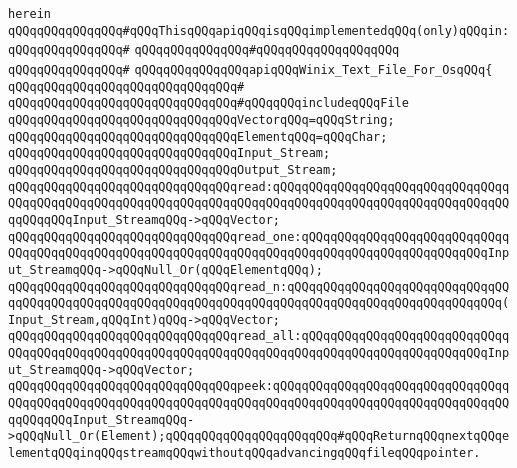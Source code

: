 \verb|herein|\newline
\newline
\verb|qQQqqQQqqQQqqQQq#qQQqThisqQQqapiqQQqisqQQqimplementedqQQq(only)qQQqin:|\newline
\verb|qQQqqQQqqQQqqQQq#|\newline
\verb|qQQqqQQqqQQqqQQq#qQQqqQQqqQQqqQQqqQQq|\newline
\verb|qQQqqQQqqQQqqQQq#|\newline
\verb|qQQqqQQqqQQqqQQqapiqQQqWinix_Text_File_For_OsqQQq{|\newline
\verb|qQQqqQQqqQQqqQQqqQQqqQQqqQQqqQQq#|\newline
\verb|qQQqqQQqqQQqqQQqqQQqqQQqqQQqqQQq#qQQqqQQqincludeqQQqFile|\newline
\verb|qQQqqQQqqQQqqQQqqQQqqQQqqQQqqQQqVectorqQQq=qQQqString;|\newline
\verb|qQQqqQQqqQQqqQQqqQQqqQQqqQQqqQQqElementqQQq=qQQqChar;|\newline
\newline
\verb|qQQqqQQqqQQqqQQqqQQqqQQqqQQqqQQqInput_Stream;|\newline
\verb|qQQqqQQqqQQqqQQqqQQqqQQqqQQqqQQqOutput_Stream;|\newline
\newline
\verb|qQQqqQQqqQQqqQQqqQQqqQQqqQQqqQQqread:qQQqqQQqqQQqqQQqqQQqqQQqqQQqqQQqqQQqqQQqqQQqqQQqqQQqqQQqqQQqqQQqqQQqqQQqqQQqqQQqqQQqqQQqqQQqqQQqqQQqqQQqqQQqqQQqInput_StreamqQQq->qQQqVector;|\newline
\verb|qQQqqQQqqQQqqQQqqQQqqQQqqQQqqQQqread_one:qQQqqQQqqQQqqQQqqQQqqQQqqQQqqQQqqQQqqQQqqQQqqQQqqQQqqQQqqQQqqQQqqQQqqQQqqQQqqQQqqQQqqQQqqQQqqQQqInput_StreamqQQq->qQQqNull_Or(qQQqElementqQQq);|\newline
\newline
\verb|qQQqqQQqqQQqqQQqqQQqqQQqqQQqqQQqread_n:qQQqqQQqqQQqqQQqqQQqqQQqqQQqqQQqqQQqqQQqqQQqqQQqqQQqqQQqqQQqqQQqqQQqqQQqqQQqqQQqqQQqqQQqqQQqqQQqqQQq(Input_Stream,qQQqInt)qQQq->qQQqVector;|\newline
\verb|qQQqqQQqqQQqqQQqqQQqqQQqqQQqqQQqread_all:qQQqqQQqqQQqqQQqqQQqqQQqqQQqqQQqqQQqqQQqqQQqqQQqqQQqqQQqqQQqqQQqqQQqqQQqqQQqqQQqqQQqqQQqqQQqqQQqInput_StreamqQQq->qQQqVector;|\newline
\newline
\verb|qQQqqQQqqQQqqQQqqQQqqQQqqQQqqQQqpeek:qQQqqQQqqQQqqQQqqQQqqQQqqQQqqQQqqQQqqQQqqQQqqQQqqQQqqQQqqQQqqQQqqQQqqQQqqQQqqQQqqQQqqQQqqQQqqQQqqQQqqQQqqQQqqQQqInput_StreamqQQq->qQQqNull_Or(Element);qQQqqQQqqQQqqQQqqQQqqQQq#qQQqReturnqQQqnextqQQqelementqQQqinqQQqstreamqQQqwithoutqQQqadvancingqQQqfileqQQqpointer.|\newline
